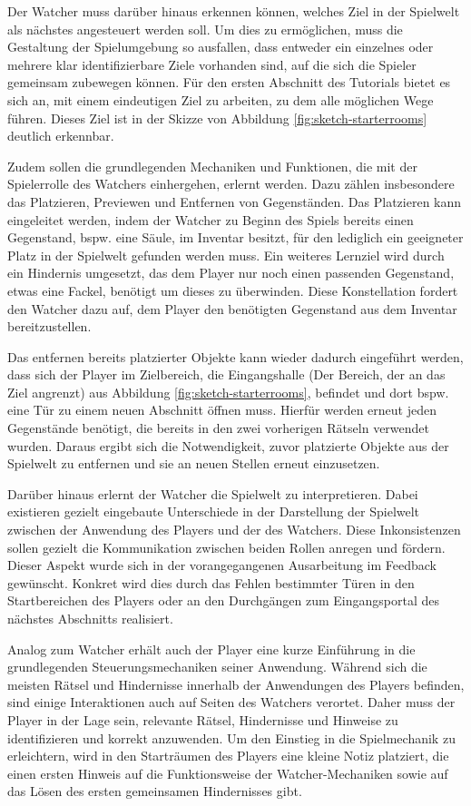 Der Watcher muss darüber hinaus erkennen können, welches Ziel in der Spielwelt als nächstes angesteuert werden soll. Um dies zu ermöglichen, muss die Gestaltung der Spielumgebung so ausfallen, dass entweder ein einzelnes oder mehrere klar identifizierbare Ziele vorhanden sind, auf die sich die Spieler gemeinsam zubewegen können. Für den ersten Abschnitt des Tutorials bietet es sich an, mit einem eindeutigen Ziel zu arbeiten, zu dem alle möglichen Wege führen. Dieses Ziel ist in der Skizze von Abbildung \ref{fig:sketch-starterrooms} deutlich erkennbar.

Zudem sollen die grundlegenden Mechaniken und Funktionen, die mit der Spielerrolle des Watchers einhergehen, erlernt werden. Dazu zählen insbesondere das Platzieren, Previewen und Entfernen von Gegenständen. Das Platzieren kann eingeleitet werden, indem der Watcher zu Beginn des Spiels bereits einen Gegenstand, bspw. eine Säule, im Inventar besitzt, für den lediglich ein geeigneter Platz in der Spielwelt gefunden werden muss. Ein weiteres Lernziel wird durch ein Hindernis umgesetzt, das dem Player nur noch einen passenden Gegenstand, etwas eine Fackel, benötigt um dieses zu überwinden. Diese Konstellation fordert den Watcher dazu auf, dem Player den benötigten Gegenstand aus dem Inventar bereitzustellen.

Das entfernen bereits platzierter Objekte kann wieder dadurch eingeführt werden, dass sich der Player im Zielbereich, die Eingangshalle (Der Bereich, der an das Ziel angrenzt) aus Abbildung \ref{fig:sketch-starterrooms}, befindet und dort bspw. eine Tür zu einem neuen Abschnitt öffnen muss. Hierfür werden erneut jeden Gegenstände benötigt, die bereits in den zwei vorherigen Rätseln verwendet wurden. Daraus ergibt sich die Notwendigkeit, zuvor platzierte Objekte aus der Spielwelt zu entfernen und sie an neuen Stellen erneut einzusetzen.


Darüber hinaus erlernt der Watcher die Spielwelt zu interpretieren. Dabei existieren gezielt eingebaute Unterschiede in der Darstellung der Spielwelt zwischen der Anwendung des Players und der des Watchers. Diese Inkonsistenzen sollen gezielt die Kommunikation zwischen beiden Rollen anregen und fördern. Dieser Aspekt wurde sich in der vorangegangenen Ausarbeitung im Feedback gewünscht. Konkret wird dies durch das Fehlen bestimmter Türen in den Startbereichen des Players oder an den Durchgängen zum Eingangsportal des nächstes Abschnitts realisiert.

Analog zum Watcher erhält auch der Player eine kurze Einführung in die grundlegenden Steuerungsmechaniken seiner Anwendung. Während sich die meisten Rätsel und Hindernisse innerhalb der Anwendungen des Players befinden, sind einige Interaktionen auch auf Seiten des Watchers verortet. Daher muss der Player in der Lage sein, relevante Rätsel, Hindernisse und Hinweise zu identifizieren und korrekt anzuwenden. Um den Einstieg in die Spielmechanik zu erleichtern, wird in den Starträumen des Players eine kleine Notiz platziert, die einen ersten Hinweis auf die Funktionsweise der Watcher-Mechaniken sowie auf das Lösen des ersten gemeinsamen Hindernisses gibt.

